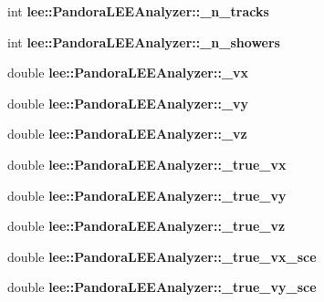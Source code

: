 \begin{DoxyCompactItemize}
\item 
\hypertarget{group__lee_ga023bb8e8a12ac261583b6d71fd1c12e2}{int {\bfseries lee\-::\-Pandora\-L\-E\-E\-Analyzer\-::\-\_\-n\-\_\-tracks}}\label{group__lee_ga023bb8e8a12ac261583b6d71fd1c12e2}

\item 
\hypertarget{group__lee_ga18da3a91fd8778add6fbd0c4e2244f89}{int {\bfseries lee\-::\-Pandora\-L\-E\-E\-Analyzer\-::\-\_\-n\-\_\-showers}}\label{group__lee_ga18da3a91fd8778add6fbd0c4e2244f89}

\item 
\hypertarget{group__lee_ga440e3b5b58670672f25f42dd09d0aa21}{double {\bfseries lee\-::\-Pandora\-L\-E\-E\-Analyzer\-::\-\_\-vx}}\label{group__lee_ga440e3b5b58670672f25f42dd09d0aa21}

\item 
\hypertarget{group__lee_gabbf5b67c1538e2771ba997ddd41c9341}{double {\bfseries lee\-::\-Pandora\-L\-E\-E\-Analyzer\-::\-\_\-vy}}\label{group__lee_gabbf5b67c1538e2771ba997ddd41c9341}

\item 
\hypertarget{group__lee_ga640cb654c98033c9294cb1fda9f86b89}{double {\bfseries lee\-::\-Pandora\-L\-E\-E\-Analyzer\-::\-\_\-vz}}\label{group__lee_ga640cb654c98033c9294cb1fda9f86b89}

\item 
\hypertarget{group__lee_ga537783c86380bbaf3357e3633f07ed7f}{double {\bfseries lee\-::\-Pandora\-L\-E\-E\-Analyzer\-::\-\_\-true\-\_\-vx}}\label{group__lee_ga537783c86380bbaf3357e3633f07ed7f}

\item 
\hypertarget{group__lee_gac8bd6c7a1c52045790f54232855c1073}{double {\bfseries lee\-::\-Pandora\-L\-E\-E\-Analyzer\-::\-\_\-true\-\_\-vy}}\label{group__lee_gac8bd6c7a1c52045790f54232855c1073}

\item 
\hypertarget{group__lee_gab2c80253d7af767bc7435a95b714d546}{double {\bfseries lee\-::\-Pandora\-L\-E\-E\-Analyzer\-::\-\_\-true\-\_\-vz}}\label{group__lee_gab2c80253d7af767bc7435a95b714d546}

\item 
\hypertarget{group__lee_ga8a638838ed9a1cde42fd00a198c3521b}{double {\bfseries lee\-::\-Pandora\-L\-E\-E\-Analyzer\-::\-\_\-true\-\_\-vx\-\_\-sce}}\label{group__lee_ga8a638838ed9a1cde42fd00a198c3521b}

\item 
\hypertarget{group__lee_ga1ea9a05e0b69aca1c22072cae8482b81}{double {\bfseries lee\-::\-Pandora\-L\-E\-E\-Analyzer\-::\-\_\-true\-\_\-vy\-\_\-sce}}\label{group__lee_ga1ea9a05e0b69aca1c22072cae8482b81}


\end{DoxyCompactItemize}
